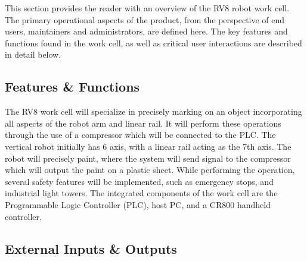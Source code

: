 This section provides the reader with an overview of the RV8 robot work cell. The primary operational aspects of the product, from the perspective of end users, maintainers and administrators, are defined here. The key features and functions found in the work cell, as well as critical user interactions are described in detail below.

\subsection{Features \& Functions}
The RV8 work cell will specialize in precisely marking on an object incorporating all aspects of the robot arm and linear rail. It will perform these operations through the use of a compressor which will be connected to the PLC. The vertical robot initially has 6 axis, with a linear rail acting as the 7th axis. The robot will precisely paint, where the system will send signal to the compressor which will output the paint on a plastic sheet. While performing the operation, several safety features will be implemented, such as emergency stops, and industrial light towers. The integrated components of the work cell are the Programmable Logic Controller (PLC), host PC, and a CR800 handheld controller.

\subsection{External Inputs \& Outputs}
\begin{table}[H]
\caption{Overview of external inputs and outputs}
\end{table}

